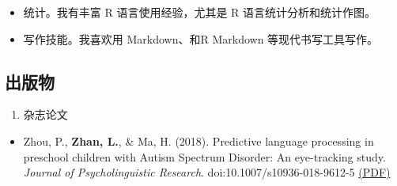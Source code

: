\documentclass[10pt,]{article}
\providecommand{\tightlist}{%
  \setlength{\itemsep}{0pt}\setlength{\parskip}{0pt}}
\begin{document}
\begin{itemize}
\tightlist
\item
  统计。我有丰富 R 语言使用经验，尤其是 R 语言统计分析和统计作图。
\item
  写作技能。我喜欢用 Markdown、和R Markdown 等现代书写工具写作。
\end{itemize}

\subsection{出版物}

\begin{enumerate}
\def\labelenumi{\arabic{enumi}.}
\tightlist
\item
  杂志论文
\end{enumerate}

\begin{itemize}
\tightlist
\item
  Zhou, P., \textbf{Zhan, L.}, \& Ma, H. (2018). Predictive language
  processing in preschool children with Autism Spectrum Disorder: An
  eye-tracking study. \emph{Journal of Psycholinguistic Research}.
  doi:10.1007/s10936-018-9612-5
  \href{https://publications.likan.info/Periodicals/JPsycholinguistRes2018.pdf}{(PDF)}
\end{itemize}
\end{document}
